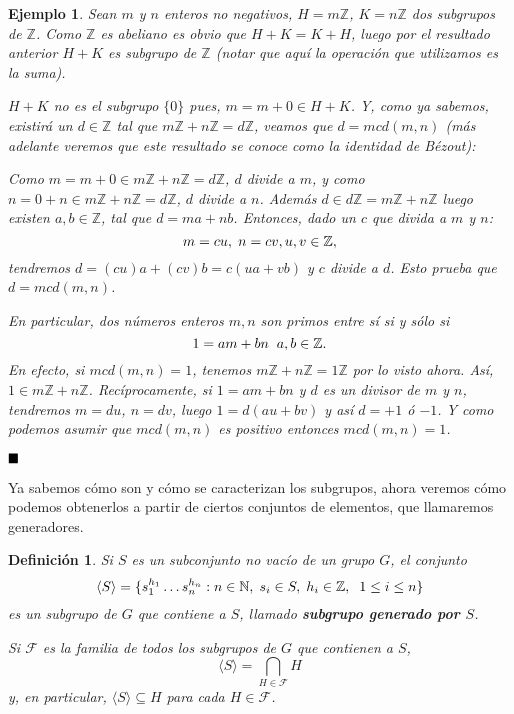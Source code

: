 \documentclass[12pt]{article}
\newtheorem{definition}[theorem]{Definición}
\newtheorem{example}{Ejemplo}[theorem]
\begin{document}
\begin{example}\label{eq:gib}Sean $m$ y $n$ enteros no negativos, $H = m\mathbb{Z}$, $K = n\mathbb{Z}$ dos subgrupos de $\mathbb{Z}$. Como $\mathbb{Z}$ es abeliano es obvio que $H+K = K+H$, luego por el resultado anterior $H+K$ es subgrupo de $\mathbb{Z}$ (notar que aquí la operación que utilizamos es la suma).


$H+K$ no es el subgrupo $\lbrace 0 \rbrace$ pues, $m = m + 0 \in H + K$. Y, como ya sabemos, existirá un $d \in \mathbb{Z}$ tal que $m\mathbb{Z}+n\mathbb{Z} = d\mathbb{Z}$, veamos que $d = mcd(m,n)$ (más adelante veremos que este resultado se conoce como la identidad de Bézout):

Como $m = m + 0 \in m\mathbb{Z}+n\mathbb{Z} = d\mathbb{Z}$, $d$ divide a $m$, y como $n = 0 + n \in m\mathbb{Z}+n\mathbb{Z} = d\mathbb{Z}$, $d$ divide a $n$. Además $d \in d\mathbb{Z} = m\mathbb{Z} + n\mathbb{Z}$ luego existen $a,b \in \mathbb{Z}$, tal que $d = ma + nb$. Entonces, dado un $c$ que divida a $m$ y $n$:
$$m = cu,\hspace{0.1cm} n = cv, u, v \in \mathbb{Z},$$ tendremos $d = (cu)a + (cv)b = c(ua + vb)$ y $c$ divide a $d$. Esto prueba que $d = mcd(m,n)$. 

En particular, dos números enteros $m,n$ son primos entre sí si y sólo si $$1 = am + bn \hspace{0.2cm} a,b \in \mathbb{Z}.$$ En efecto, si $mcd(m,n) = 1$, tenemos $m\mathbb{Z} + n\mathbb{Z} = 1\mathbb{Z}$ por lo visto ahora. Así, $1 \in m\mathbb{Z}+n\mathbb{Z}$. Recíprocamente, si $1 = am + bn$ y $d$ es un divisor de $m$ y $n$, tendremos $m = du$, $n = dv$, luego $1 = d(au + bv)$ y así $d = +1$ ó $-1$. Y como podemos asumir que $mcd(m,n)$ es positivo entonces $mcd(m,n) = 1$.
\end{example}

$\hfill \blacksquare$

Ya sabemos cómo son y cómo se caracterizan los subgrupos, ahora veremos cómo podemos obtenerlos a partir de ciertos conjuntos de elementos, que llamaremos generadores.

\begin{definition}Si $S$ es un subconjunto no vacío de un grupo $G$, el conjunto $$\langle S \rangle = \lbrace s_{1}^{h_{1}} \ldots s_{n}^{h_{n}} : n \in \mathbb{N},\hspace{0.1cm} s_{i} \in S,\hspace{0.1cm} h_{i} \in \mathbb{Z}, \hspace{0.2cm} 1 \leq i \leq n \rbrace$$ es un subgrupo de $G$ que contiene a $S$, llamado \textbf{subgrupo generado por $S$}.


Si $\mathcal{F}$ es la familia de todos los subgrupos de $G$ que contienen a $S$, $$ \langle S \rangle = \bigcap_{H \in \mathcal{F}} H$$ y, en particular, $\langle S\rangle \subseteq H$ para cada $H \in \mathcal{F}$.
\end{definition}
\end{document}
